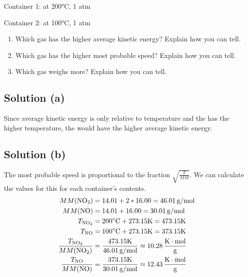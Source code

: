 \documentclass[10pt]{article}
\begin{document}
        Container 1:  at 200\unit{\celsius}, 1 atm 
        
        Container 2:  at 100\unit{\celsius}, 1 atm
        
        \begin{enumerate} [label=\alph*)]
            \item Which gas has the higher average kinetic energy? Explain how you can tell.
            \item Which gas has the higher most probable speed? Explain how you can tell.
            \item Which gas weighs more? Explain how you can tell.
        \end{enumerate}

        \subsection{Solution (a)}
            Since average kinetic energy is only relative to temperature and the  has the higher temperature, the  would have the higher average kinetic energy. 

        \subsection{Solution (b)}
            The most probable speed is proportional to the fraction $\sqrt{\frac{T}{MM}}$. 
            We can calculate the values for this for each container's contents.
            \begin{align}
                MM(\ce{NO2})&=  14.01 + 2 * 16.00
                    =   46.01\,\unit{\gram/\mole}\\
                MM(\ce{NO}) &=  14.01 + 16.00
                    =   30.01\,\unit{\gram/\mole}\\
                T_{\ce{NO2}}&=  200\unit{\celsius} + 273.15\unit{\kelvin}
                    =   473.15\unit{\kelvin}\\
                T_{\ce{NO}} &=  100\unit{\celsius} + 273.15\unit{\kelvin}
                    =   373.15\unit{\kelvin}\\
                \frac{T_{\ce{NO2}}}{MM(\ce{NO2})}   &=  \frac{473.15\unit{\kelvin}}{46.01\,\unit{\gram/\mole}}
                    \approx 10.28\,\unit{\frac{\kelvin\cdot\mole}{\gram}}\\
                \frac{T_{\ce{NO}}}{MM(\ce{NO})} &=  \frac{373.15\unit{\kelvin}}{30.01\,\unit{\gram/\mole}}
                    \approx 12.43\,\unit{\frac{\kelvin\cdot\mole}{\gram}}
            \end{align}
\end{document}
